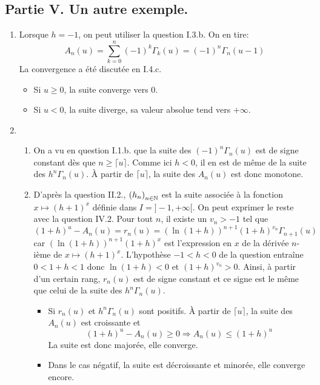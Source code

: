 \subsection*{Partie V. Un autre exemple.}
\begin{enumerate}
\item Lorsque $h=-1$, on peut utiliser la question I.3.b. On en tire:
\begin{displaymath}
 A_n(u) = \sum_{k=0}^n(-1)^k\Gamma_k(u) = (-1)^n \Gamma_n(u-1)
\end{displaymath}
La convergence a été discutée en I.4.c.
\begin{itemize}
 \item Si $u\geq 0$, la suite converge vers $0$.
 \item Si $u<0$, la suite diverge, sa valeur absolue tend vers $+\infty$.
\end{itemize}

\item
\begin{enumerate}
\item On a vu en question I.1.b. que la suite des $(-1)^n\Gamma_n(u)$ est de signe constant dès que $n\geq \lceil u \rceil$. Comme ici $h<0$, il en est de même de la suite des $h^n\Gamma_n(u)$.\newline
\`A partir de $\lceil u \rceil$, la suite des $A_n(u)$ est donc monotone.

\item D'après la question II.2., $\left( h_n\right) _{n\in \mathbb{N}}$ est la suite associée à la fonction $x\mapsto (h+1)^x$ définie dans $I = ]-1,+\infty[$. On peut exprimer le reste avec la question IV.2. Pour tout $n$, il existe un $v_n>-1$ tel que 
\begin{displaymath}
 (1+h)^u - A_n(u) = r_n(u) = (\ln(1+h))^{n+1}(1+h)^{v_n}\Gamma_{n+1}(u)
\end{displaymath}
car $(\ln(1+h))^{n+1}(1+h)^{x}$ est l'expression en $x$ de la dérivée $n$-ième de $x\mapsto (h+1)^x$.\newline
L'hypothèse $-1<h<0$ de la question entraîne $0<1+h<1$ donc $\ln(1+h)<0$ et $(1+h)^{v_n}>0$. Ainsi, à partir d'un certain rang, $r_n(u)$ est de signe constant et ce signe est le même que celui de la suite des $h^n\Gamma_n(u)$.
\begin{itemize}
 \item Si $r_n(u)$ et $h^n\Gamma_n(u)$ sont positifs. \`A partir de $\lceil u \rceil$, la suite des $A_n(u)$ est croissante et
\begin{displaymath}
 (1+h)^u - A_n(u) \geq 0 \Rightarrow A_n(u)\leq (1+h)^u
\end{displaymath}
La suite est donc majorée, elle converge.
\item Dans le cas négatif, la suite est décroissante et minorée, elle converge encore.
\end{itemize}


\end{enumerate}
\end{enumerate}

